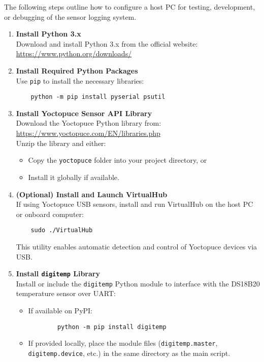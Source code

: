 \documentclass[../main.tex]{subfiles}
\begin{document}
The following steps outline how to configure a host PC for testing, development, or debugging of the sensor logging system.

\begin{enumerate}
    \item \textbf{Install Python 3.x} \\
    Download and install Python 3.x from the official website: \\
    \url{https://www.python.org/downloads/}
    
    \item \textbf{Install Required Python Packages} \\
    Use \texttt{pip} to install the necessary libraries:
    \begin{verbatim}
    python -m pip install pyserial psutil
    \end{verbatim}

    \item \textbf{Install Yoctopuce Sensor API Library} \\
    Download the Yoctopuce Python library from: \\
    \url{https://www.yoctopuce.com/EN/libraries.php} \\
    Unzip the library and either:
    \begin{itemize}
        \item Copy the \texttt{yoctopuce} folder into your project directory, or
        \item Install it globally if available.
    \end{itemize}

    \item \textbf{(Optional) Install and Launch VirtualHub} \\
    If using Yoctopuce USB sensors, install and run VirtualHub on the host PC or onboard computer:
    \begin{verbatim}
    sudo ./VirtualHub
    \end{verbatim}
    This utility enables automatic detection and control of Yoctopuce devices via USB.

    \item \textbf{Install \texttt{digitemp} Library} \\
    Install or include the \texttt{digitemp} Python module to interface with the DS18B20 temperature sensor over UART:
    \begin{itemize}
        \item If available on PyPI:
        \begin{verbatim}
        python -m pip install digitemp
        \end{verbatim}
        \item If provided locally, place the module files (\texttt{digitemp.master}, \texttt{digitemp.device}, etc.) in the same directory as the main script.
    \end{itemize}


\end{enumerate}
\end{document}
